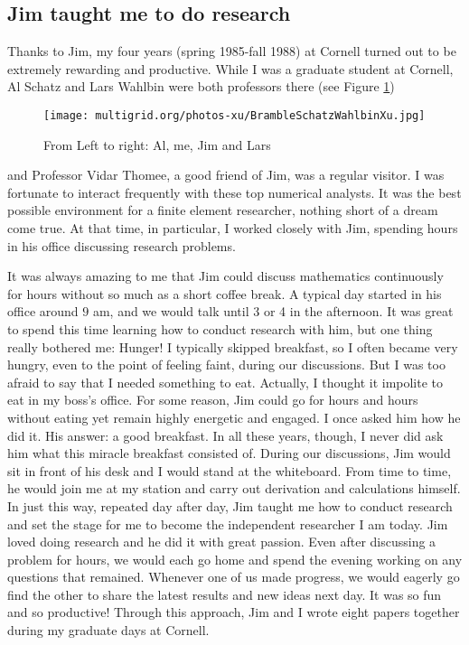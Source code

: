 \documentclass[CJK,11pt]{amsart}
\theoremstyle{definition}
\begin{document}
\begin{CJK*}{UTF8}{gbsn}
\section{Jim taught me to do research}
Thanks to Jim, my four years (spring 1985-fall 1988) at Cornell turned out to be extremely rewarding and productive. While I was a graduate student at Cornell, Al Schatz and Lars Wahlbin were both professors there (see Figure \ref{Fig1})
\begin{figure}[h]
 \texttt{[image: multigrid.org/photos-xu/BrambleSchatzWahlbinXu.jpg]}
 \caption{\tiny From Left to right: Al, me, Jim and Lars}
 \label{Fig1}
\end{figure}
and Professor Vidar Thomee, a good friend of Jim, was a regular visitor. I was fortunate to interact frequently with these top numerical analysts. It was the best possible environment for a finite element researcher, nothing short of a dream come true. At that time, in particular, I worked closely with Jim, spending hours in his office discussing research problems. 

It was always amazing to me that Jim could discuss mathematics continuously for hours without so much as a short coffee break. A typical day started in his office around $9$ am, and we would talk until 3 or 4 in the afternoon. It was great to spend this time learning how to conduct research with him, but one thing really bothered me: Hunger! I typically skipped breakfast, so I often became very hungry, even to the point of feeling faint, during our discussions. But I was too afraid to say that I needed something to eat. Actually, I thought it impolite to eat in my boss's office. For some reason, Jim could go for hours and hours without eating yet remain highly energetic and engaged. I once asked him how he did it. His answer: a good breakfast. In all these years, though, I never did ask him what this miracle breakfast consisted of.
During our discussions, Jim would sit in front of his desk and I would stand at the whiteboard. From time to time, he would join me at my station and carry out derivation and calculations himself. In just this way, repeated day after day, Jim taught me how to conduct research and set the stage for me to become the independent researcher I am today. Jim loved doing research and he did it with great passion. Even after discussing a problem for hours, we would each go home and spend the evening working on any questions that remained. Whenever one of us made progress, we would eagerly go find the other to share the latest results and new ideas next day. It was so fun and so productive! Through this approach, Jim and I wrote eight papers together during my graduate days at Cornell.


\end{CJK*}
\end{document}
